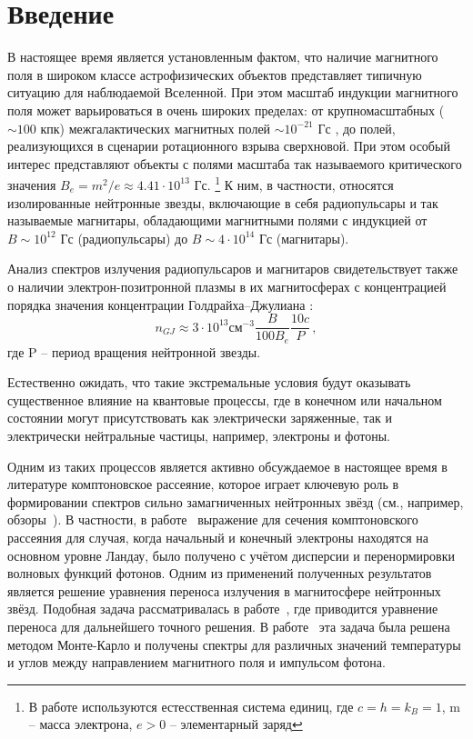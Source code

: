 \documentclass[a4paper]{panl}
\begin{document}
\section*{Введение}
В настоящее время является установленным
фактом, что наличие магнитного поля в широком
классе астрофизических объектов представляет
типичную ситуацию для наблюдаемой Вселенной.
При этом масштаб индукции магнитного поля
может варьироваться в очень широких пределах:
от крупномасштабных ($\sim 100$ кпк) межгалактических магнитных полей $\sim 10^{-21}$ Гс \cite{D.Ryu:2012}, до полей, 
реализующихся в сценарии ротационного взрыва сверхновой. При этом особый 
интерес представляют объекты с полями масштаба так
называемого критического значения $B_e=m^2/e\approx4.41\cdot10^{13}$ Гс.
\footnote{ В работе используются естесственная система единиц, где $c=h=k_B=1$, m -- масса электрона,
	$e>0$ -- элементарный заряд} К ним, в частности, относятся
изолированные нейтронные звезды, включающие в
себя радиопульсары и так называемые магнитары,
обладающими магнитными полями с индукцией от $B\sim10^{12}$ Гс (радиопульсары) до $B\sim4\cdot10^{14}$ Гс (магнитары). 

Анализ спектров излучения радиопульсаров
и магнитаров свидетельствует также о наличии
электрон-позитронной плазмы в их магнитосферах
с концентрацией порядка значения концентрации
Голдрайха–Джулиана \cite{Goldreich:1969}:
\begin{equation}
n_{GJ}\approx 3 \cdot 10^{13} \text{см}^{-3} \frac{B}{100B_e} \frac{10 c}{P}\, ,
\end{equation}
где P -- период вращения нейтронной звезды.

Естественно ожидать, что такие экстремальные
условия будут оказывать существенное влияние на
квантовые процессы, где в конечном или начальном
состоянии могут присутствовать как электрически
заряженные, так и электрически нейтральные частицы, например, электроны и фотоны.

Одним из таких процессов является активно обсуждаемое в настоящее время в литературе комптоновское рассеяние, которое играет ключевую роль в формировании спектров сильно замагниченных нейтронных звёзд (см., например, обзоры~\cite{Suleimanov:2007it,RCh09,Kuznetsov:2015}).
В частности, в работе~\cite{RCh09} 
выражение для сечения комптоновского рассеяния для случая, когда начальный и конечный электроны находятся на основном уровне Ландау, было получено с учётом дисперсии и перенормировки волновых функций фотонов. Одним из применений полученных результатов является решение уравнения переноса излучения в магнитосфере нейтронных звёзд. Подобная задача рассматривалась в работе~\cite{Mushtukov:2016}, где приводится уравнение переноса для дальнейшего точного решения.
В работе~\cite{Mushtukov:2022} эта задача была решена методом Монте-Карло и получены спектры для различных значений температуры и углов между направлением магнитного поля и импульсом фотона.
\end{document}
